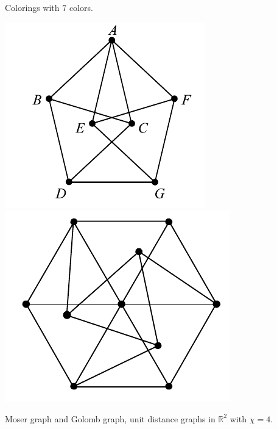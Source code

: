 \documentclass[a4paper]{article}
\newcommand{\RR}{\mathbb{R}}
\begin{document}
Colorings with $7$ colors.

\bigskip

\includegraphics[scale=0.4]{mf6.png} \includegraphics[scale=0.4]{mf7.png}

Moser graph and Golomb graph, unit distance graphs in $\RR^2$ with $\chi=4$.
\end{document}
